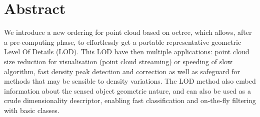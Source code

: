  
\section{Abstract}
	We introduce a new ordering for point cloud based on octree, which allows, after a pre-computing phase, 
	to effortlessly get a portable representative geometric Level Of Details (LOD).
	This LOD have then multiple applications: point cloud size reduction for 
	visualisation (point cloud streaming) or speeding of slow algorithm,
	 fast density peak detection and correction as well as safeguard for methods that may be sensible to density variations.
	The LOD method also embed information about the sensed object geometric nature, 
	and can also be used as a crude dimensionality descriptor, 
	enabling fast classification and on-the-fly filtering with basic classes. 
	 
	
